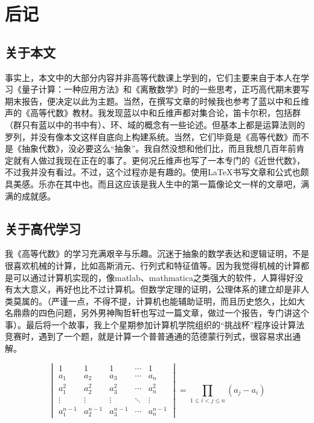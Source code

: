 \documentclass[12pt,hyperref,a4paper,UTF8]{ctexart}
\begin{document}

\section{后记}

\subsection{关于本文}
事实上，本文中的大部分内容并非高等代数课上学到的，它们主要来自于本人在学习《量子计算：一种应用方法》和《离散数学》时的一些思考，正巧高代期末要写期末报告，便决定以此为主题。当然，在撰写文章的时候我也参考了蓝以中和丘维声的《高等代数》教材。我发现蓝以中和丘维声都对集合论，笛卡尔积，包括群（群只有蓝以中的书中有）、环、域的概念有一些论述。但基本上都是运算法则的罗列，并没有像本文这样自底向上构建系统。当然，它们毕竟是《高等代数》而不是《抽象代数》，没必要这么“抽象”。我自然没想和他们比，而且我想几百年前肯定就有人做过我现在正在的事了。更何况丘维声也写了一本专门的《近世代数》，不过我并没有看过。不过，这个过程亦是有趣的。使用\LaTeX 书写文章和公式也颇具美感。乐亦在其中也。而且这应该是我人生中的第一篇像论文一样的文章吧，满满的成就感。

\subsection{关于高代学习}
我《高等代数》的学习充满艰辛与乐趣。沉迷于抽象的数学表达和逻辑证明，不是很喜欢机械的计算，比如高斯消元、行列式和特征值等。因为我觉得机械的计算都是可以通过计算机实现的，像matlab、mathmatica之类强大的软件，人算得好没有太大意义，再好也比不过计算机。但数学定理的证明，公理体系的建立却是非人类莫属的。（严谨一点，不得不提，计算机也能辅助证明，而且历史悠久，比如大名鼎鼎的四色问题，另外男神陶哲轩也写过一篇文章，做过一个报告，专门讲这个事）。最后将一个故事，我上个星期参加计算机学院组织的“挑战杯”程序设计算法竞赛时，遇到了一个题，就是计算一个普普通通的范德蒙行列式，很容易求出通解。

\[
\begin{vmatrix}
1 & 1 & 1 & \cdots & 1 \\
a_1 & a_2 & a_3 & \cdots & a_n \\
a_1^2 & a_2^2 & a_3^2 & \cdots & a_n^2 \\
\vdots & \vdots & \vdots & \ddots & \vdots \\
a_1^{n-1} & a_2^{n-1} & a_3^{n-1} & \cdots & a_n^{n-1}
\end{vmatrix}
= \prod_{1 \leq i < j \leq n} (a_j - a_i)
\]
\end{document}
